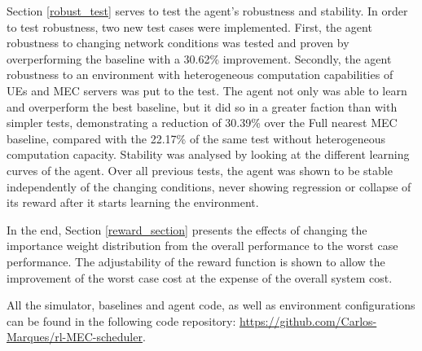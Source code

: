 Section \ref{robust_test} serves to test the agent's robustness and stability. In order to test robustness, two new test cases were implemented. First, the agent robustness to changing network conditions was tested and proven by overperforming the baseline with a 30.62\% improvement. Secondly, the agent robustness to an environment with heterogeneous computation capabilities of \acrshort{UE}s and \acrshort{MEC} servers was put to the test. The agent not only was able to learn and overperform the best baseline, but it did so in a greater faction than with simpler tests, demonstrating a reduction of 30.39\% over the Full nearest MEC baseline, compared with the 22.17\% of the same test without heterogeneous computation capacity. Stability was analysed by looking at the different learning curves of the agent. Over all previous tests, the agent was shown to be stable independently of the changing conditions, never showing regression or collapse of its reward after it starts learning the environment.

In the end, Section \ref{reward_section} presents the effects of changing the importance weight distribution from the overall performance to the worst case performance. The adjustability of the reward function is shown to allow the improvement of the worst case cost at the expense of the overall system cost.

All the simulator, baselines and agent code, as well as environment configurations can be found in the following code repository:
\href{https://github.com/Carlos-Marques/rl-MEC-scheduler}{https://github.com/Carlos-Marques/rl-MEC-scheduler}.

